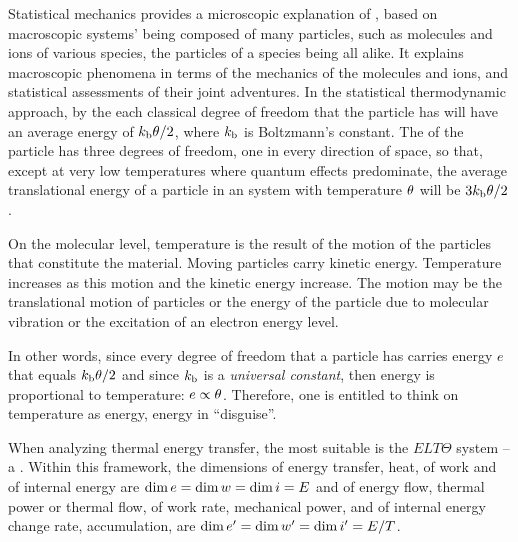 \begin{note}
Statistical mechanics provides a microscopic explanation of , based on macroscopic systems' being composed of many particles, such as molecules and ions of various species, the particles of a species being all alike. It explains macroscopic phenomena in terms of the mechanics of the molecules and ions, and statistical assessments of their joint adventures. In the statistical thermodynamic approach, by the  each classical degree of freedom that the particle has will have an average energy of $k_\text{b}\theta/2$, where $k_\text{b}$ is Boltzmann's constant. The  of the particle has three degrees of freedom, one in every direction of space, so that, except at very low temperatures where quantum effects predominate, the average translational energy of a particle in an system with temperature $\theta$ will be $3k_\text{b}\theta/2$.

On the molecular level, temperature is the result of the motion of the particles that constitute the material. Moving particles carry kinetic energy. Temperature increases as this motion and the kinetic energy increase. The motion may be the translational motion of particles or the energy of the particle due to molecular vibration or the excitation of an electron energy level.

In other words, since every degree of freedom that a particle has carries energy $e$ that equals $k_\text{b}\theta/2$ and since $k_\text{b}$ is a \emph{universal constant}, then energy is proportional to temperature: $e\propto\theta$. Therefore, one is entitled to think on temperature as energy, energy in ``disguise''.
\end{note}

\begin{dimensional}
When analyzing thermal energy transfer, the most suitable  is the $ELT\Theta$ system -- a . Within this framework, the dimensions of energy transfer, \aka heat, of work and of internal energy are $\dim e = \dim w = \dim i = E$ and of energy flow, \aka thermal power or thermal flow, of work rate, \aka mechanical power, and of internal energy change rate, \aka accumulation, are $\dim{e}^{\prime} = \dim{w}^{\prime} = \dim{i}^{\prime} = E/T$.
\end{dimensional}


